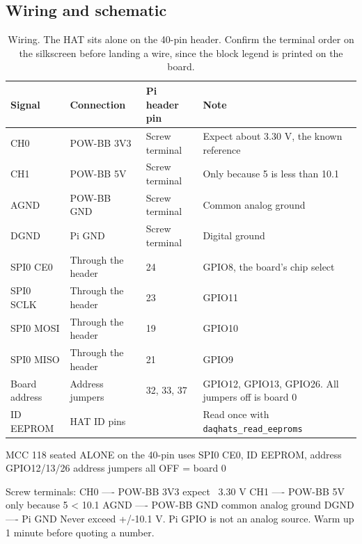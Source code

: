 \subsection*{Wiring and schematic}


\begin{table}[H]\centering\small
\begin{tabular}{p{36mm}p{30mm}p{24mm}p{62mm}}
\toprule
Signal & Connection & Pi header pin & Note \\
\midrule
CH0 & POW-BB 3V3 & Screw terminal & Expect about 3.30 V, the known reference \\
CH1 & POW-BB 5V & Screw terminal & Only because 5 is less than 10.1 \\
AGND & POW-BB GND & Screw terminal & Common analog ground \\
DGND & Pi GND & Screw terminal & Digital ground \\
SPI0 CE0 & Through the header & 24 & GPIO8, the board's chip select \\
SPI0 SCLK & Through the header & 23 & GPIO11 \\
SPI0 MOSI & Through the header & 19 & GPIO10 \\
SPI0 MISO & Through the header & 21 & GPIO9 \\
Board address & Address jumpers & 32, 33, 37 & GPIO12, GPIO13, GPIO26. All jumpers off is board 0 \\
ID EEPROM & HAT ID pins & & Read once with \texttt{daqhats\_read\_eeproms} \\
\bottomrule
\end{tabular}
\caption{Wiring. The HAT sits alone on the 40-pin header. Confirm the terminal order on the silkscreen before landing a wire, since the block legend is printed on the board.}
\end{table}

\begin{asciiart}
MCC 118 seated ALONE on the 40-pin
  uses SPI0 CE0, ID EEPROM, address GPIO12/13/26
  address jumpers all OFF = board 0

Screw terminals:
  CH0  ---- POW-BB 3V3     expect ~3.30 V
  CH1  ---- POW-BB 5V      only because 5 < 10.1
  AGND ---- POW-BB GND     common analog ground
  DGND ---- Pi GND
Never exceed +/-10.1 V. Pi GPIO is not an analog source.
Warm up 1 minute before quoting a number.
\end{asciiart}

